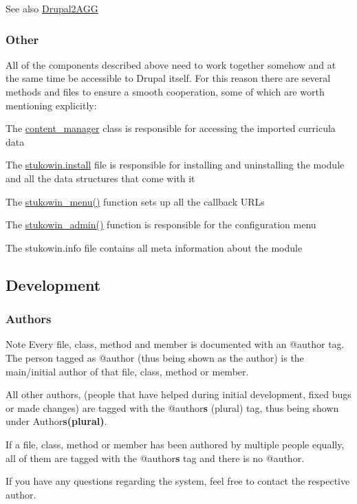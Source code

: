 \begin{DoxySeeAlso}{See also}
\hyperlink{group___drupal2_a_g_g}{Drupal2\+A\+G\+G}
\end{DoxySeeAlso}
\hypertarget{index_Other}{}\subsubsection{Other}\label{index_Other}
All of the components described above need to work together somehow and at the same time be accessible to Drupal itself. For this reason there are several methods and files to ensure a smooth cooperation, some of which are worth mentioning explicitly\+:
\begin{DoxyItemize}
\item The \hyperlink{classcontent__manager}{content\+\_\+manager} class is responsible for accessing the imported curricula data
\item The \hyperlink{stukowin_8install}{stukowin.\+install} file is responsible for installing and uninstalling the module and all the data structures that come with it
\item The \hyperlink{group___stukowin___module_ga59cfbad113b7aa2d10f0b204a5f7ba0d}{stukowin\+\_\+menu()} function sets up all the callback U\+R\+Ls
\item The \hyperlink{group___stukowin___module_ga55d453d5b6f8ae4e643308d8814e67a5}{stukowin\+\_\+admin()} function is responsible for the configuration menu
\item The stukowin.\+info file contains all meta information about the module
\end{DoxyItemize}\hypertarget{index_Development}{}\subsection{Development}\label{index_Development}
\hypertarget{index_Authors}{}\subsubsection{Authors}\label{index_Authors}
\begin{DoxyNote}{Note}
Every file, class, method and member is documented with an {\ttfamily @author} tag. The person tagged as {\ttfamily @author} (thus being shown as the author) is the main/initial author of that file, class, method or member. 

All other authors, (people that have helped during initial development, fixed bugs or made changes) are tagged with the {\ttfamily @author{\bfseries s} }(plural) tag, thus being shown under Author{\bfseries s(plural)}. 

If a file, class, method or member has been authored by multiple people equally, all of them are tagged with the {\ttfamily @author{\bfseries s} tag} and there is no {\ttfamily @author}. 

If you have any questions regarding the system, feel free to contact the respective author.
\end{DoxyNote}
